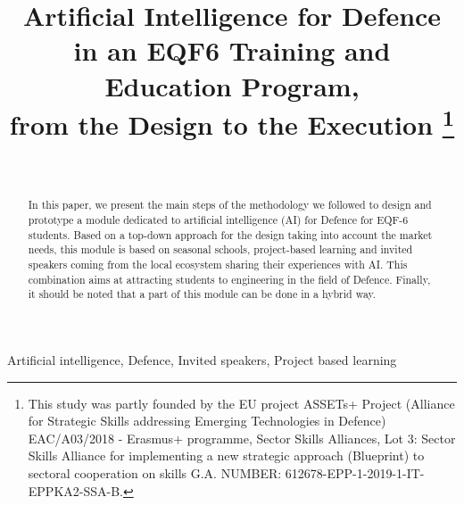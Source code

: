 \documentclass[conference]{IEEEtran}
\begin{document}
\title{Artificial Intelligence for Defence \\in an EQF6 Training and Education Program,\\ from the Design to the Execution
\thanks{This study was partly founded by the EU project ASSETs+ Project (Alliance for Strategic Skills addressing Emerging Technologies in Defence) EAC/A03/2018 - Erasmus+ programme, Sector Skills Alliances, Lot 3: Sector Skills Alliance for implementing a new strategic approach (Blueprint) to sectoral cooperation on skills G.A. NUMBER: 612678-EPP-1-2019-1-IT-EPPKA2-SSA-B.}
}

\author{
\and
{}
\\
\and
{}
}
\maketitle
\begin{abstract}
In this paper, we present the main steps of the methodology we followed to design and prototype a module dedicated to artificial intelligence (AI) for Defence for EQF-6 students. Based on a top-down approach for the design taking into account the market needs, this module is based on seasonal schools, project-based learning and invited speakers coming from the local ecosystem sharing their experiences with AI. This combination aims at attracting students to engineering in the field of Defence. Finally, it should be noted that a part of this module can be done in a hybrid way. 
 \end{abstract}

\begin{IEEEkeywords}
Artificial intelligence, Defence, Invited speakers, Project based learning
\end{IEEEkeywords}
\end{document}
